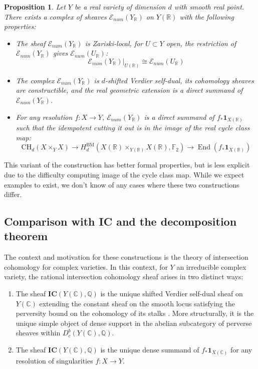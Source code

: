 \documentclass{amsart}
\newtheorem{prop}[thm]{Proposition}
\theoremstyle{definition}
\theoremstyle{remark}
\DeclareMathOperator{\End}{End}
\begin{document}
\begin{prop}
Let $Y$ be a real variety of dimension $d$ with smooth real point. There exists a complex of sheaves $\mathscr{E}_{num}(Y_\mathbb{R})$ on $Y(\mathbb{R})$ with the following properties:
\begin{itemize}
     \item The sheaf $\mathscr{E}_{num}(Y_\mathbb{R})$ is Zariski-local, for $U\subset Y$ open, the restriction of $\mathscr{E}_{num}(Y_\mathbb{R})$ gives $\mathscr{E}_{num}(U_\mathbb{R})$:\[\mathscr{E}_{num}(Y_\mathbb{R})|_{U(\mathbb{R})}\cong \mathscr{E}_{num}(U_\mathbb{R})\]
     \item The complex $\mathscr{E}_{num}(Y_\mathbb{R})$ is $d$-shifted Verdier self-dual, its cohomology sheaves are constructible, and the real geometric extension is a direct summand of $\mathscr{E}_{num}(Y_\mathbb{R})$.

    \item For any resolution $f:X\to Y$, $\mathscr{E}_{num}(Y_\mathbb{R})$ is a direct summand of $f_*\mathbf{1}_{X(\mathbb{R})}$ such that the idempotent cutting it out is in the image of the real cycle class map: \[\mathrm{CH}_d(X\times_Y X)\to H^{\mathrm{BM}}_d(X(\mathbb{R})\times_{Y(\mathbb{R})}X(\mathbb{R}),\mathbb{F}_2) \to \End(f_*\mathbf{1}_{X(\mathbb{R})})\]
    
\end{itemize}

\end{prop}

This variant of the construction has better formal properties, but is less explicit due to the difficulty computing  image of the cycle class map. While we expect examples to exist, we don't know of any cases where these two constructions differ.
\subsection{Comparison with IC and the decomposition theorem}

The context and motivation for these constructions is the theory of intersection cohomology for complex varieties. In this context, for $Y$ an irreducible complex variety, the rational intersection cohomology sheaf arises in two distinct ways:

\begin{enumerate}
     \item[Intrinsic)] The sheaf $\mathbf{IC}(Y(\mathbb{C}),\mathbb{Q})$ is the unique shifted Verdier self-dual sheaf on $Y(\mathbb{C})$ extending the constant sheaf on the smooth locus satisfying the perversity bound on the cohomology of its stalks \cite[\S 2]{deCataldo2009decomposition}. More structurally, it is the unique simple object of dense support in the abelian subcategory of perverse sheaves within $D^b_c(Y(\mathbb{C}),\mathbb{Q})$.
    
    \item[Extrinsic)] The sheaf $\mathbf{IC}(Y(\mathbb{C}),\mathbb{Q})$ is the unique dense summand of $f_*\mathbf{1}_{X(\mathbb{C})}$ for any resolution of singularities $f:X\to Y$. 
   
\end{enumerate}
\end{document}
